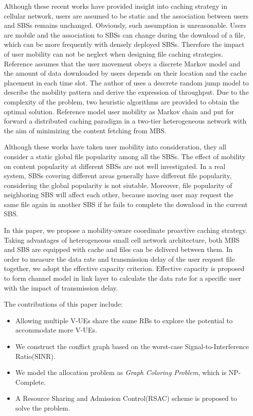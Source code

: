 \documentclass[conference]{IEEEtran}
\begin{document}
Although these recent works have provided insight into caching strategy in cellular network, users are assumed to be static and the association between users and SBSs remains unchanged. Obviously, such assumption is unreasonable. Users are mobile and the association to SBSs can change during the download of a file, which can be more   frequently with densely deployed SBSs. Therefore the impact of user mobility can not be neglect when designing file caching strategies\cite{7537180}. Reference\cite{6620380} assumes that the user movement obeys a discrete Markov model and the amount of data downloaded by users depends on their location and the cache placement in each time slot. The author of \cite{8013789}uses a descrete random jump model to describe the mobility pattern and derive the expression of throughput. Due to the complexity of the problem, two heuristic algorithms are provided to obtain the optimal solution. Reference \cite{7484297} model user mobility as Markov chain and put for forward a distributed caching paradigm in a two-tier heterogeneous network with the aim of minimizing the content fetching from MBS.

Although these works have taken user mobility into consideration, they all consider a static global file popularity among all the SBSs. The effect of mobility on content popularity at different SBSs are not well investigated. In a real system, SBSs covering different areas generally have different file popularity, considering the global popularity is not siutable. Moreover, file popularity of neighboring SBS will affect each other, because moving user may request the same file again in another SBS if he fails to complete the download in the current SBS.

In this paper, we propose a mobility-aware coordinate proavtive caching strategy. Taking advantages of heterogeneous small cell network architecture, both MBS and SBS are equipped with cache and files can be deliverd between them. In order to measure the data rate and transmission delay of the user request file together, we adopt the effective capacity criterion. Effective capacity is proposed to form channel model in link layer to calculate the data rate for a specific user with the impact of transmission delay.

The contributions of this paper include:
\begin{itemize}
 \item Allowing multiple V-UEs share the same RBs to explore the potential to accommodate more V-UEs.
 \item We construct the conflict graph based on the worst-case Signal-to-Interference Ratio(SINR).
 \item We model the allocation problem as \emph{Graph Coloring Problem}, which is NP-Complete.
 \item A Resource Sharing and Admission Control(RSAC) scheme is proposed to solve the problem.
\end{itemize}
\end{document}
